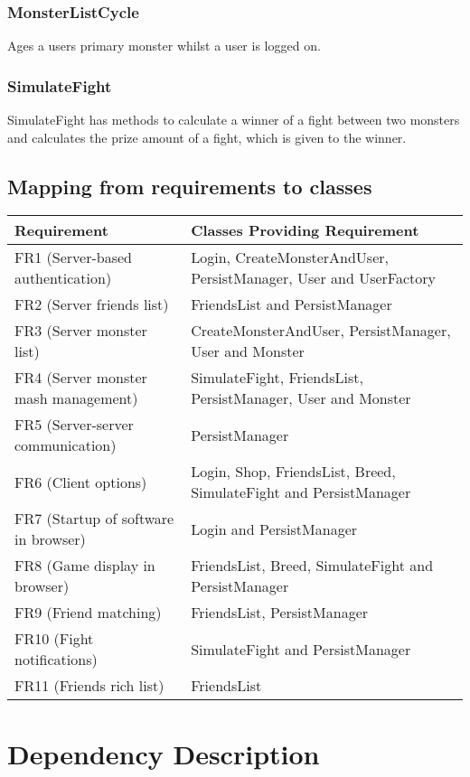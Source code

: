 \documentclass[titlepage]{article}
\begin{document}
\subsubsection{MonsterListCycle}
Ages a users primary monster whilst a user is logged on.
\subsubsection{SimulateFight}
SimulateFight has methods to calculate a winner of a fight between two monsters and calculates the prize amount of a fight, which is given to the winner.
\subsection{Mapping from requirements to classes}
\begin{tabular}{| l | l |}
\hline
Requirement & Classes Providing Requirement \\
\hline
FR1 (Server-based authentication) & Login, CreateMonsterAndUser, PersistManager, User and UserFactory \\
\hline
FR2 (Server friends list) & FriendsList and PersistManager \\
\hline
FR3 (Server monster list) & CreateMonsterAndUser, PersistManager, User and Monster \\
\hline
FR4 (Server monster mash management) & SimulateFight, FriendsList, PersistManager, User and Monster \\
\hline
FR5 (Server-server communication) & PersistManager \\
\hline
FR6 (Client options) & Login, Shop, FriendsList, Breed, SimulateFight and PersistManager \\
\hline
FR7 (Startup of software in browser) & Login and PersistManager \\
\hline
FR8 (Game display in browser) & FriendsList, Breed, SimulateFight and PersistManager \\
\hline
FR9 (Friend matching) & FriendsList, PersistManager \\
\hline
FR10 (Fight notifications) & SimulateFight and PersistManager \\
\hline
FR11 (Friends rich list) & FriendsList \\
\hline
\end{tabular}
\newpage

\section{Dependency Description}
\end{document}
